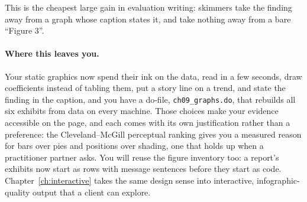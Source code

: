\documentclass[
    a4paper,
    fontsize=10pt,
    twoside=true,
    numbers=noenddot,
]{kaobook}
\begin{document}
This is the cheapest large gain in evaluation writing: skimmers take the finding away from a graph whose caption states it, and take nothing away from a bare \enquote{Figure 3}.

\paragraph{Where this leaves you.} Your static graphics now spend their ink on the data, read in a few seconds, draw coefficients instead of tabling them, put a story line on a trend, and state the finding in the caption, and you have a do-file, \texttt{ch09\_graphs.do}, that rebuilds all six exhibits from data on every machine. Those choices make your evidence accessible on the page, and each comes with its own justification rather than a preference: the Cleveland--McGill perceptual ranking gives you a measured reason for bars over pies and positions over shading, one that holds up when a practitioner partner asks. You will reuse the figure inventory too: a report's exhibits now start as rows with message sentences before they start as code. Chapter~\ref{ch:interactive} takes the same design sense into interactive, infographic-quality output that a client can explore.
\end{document}
